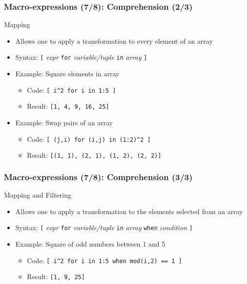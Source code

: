 \documentclass[aspectratio=169]{beamer}
\begin{document}
\begin{frame}[fragile=singleslide]
  \frametitle{Macro-expressions (7/8): Comprehension (2/3)}
  \begin{block}{Mapping}
    \begin{itemize}
    \item Allows one to apply a transformation to every element of an array
    \item Syntax: \texttt{[} \textit{expr} \texttt{for} \textit{variable/tuple}
      \texttt{in} \textit{array} \texttt{]}
    \item Example: Square elements in array
      \begin{itemize}
      \item Code: \texttt{[ i\^{}2 for i in 1:5 ]}
      \item Result: \texttt{[1, 4, 9, 16, 25]}
      \end{itemize}
    \item Example: Swap pairs of an array
      \begin{itemize}
      \item Code: \texttt{[ (j,i) for (i,j) in (1:2)\^{}2 ]}
      \item Result: \texttt{[(1, 1), (2, 1), (1, 2), (2, 2)]}
      \end{itemize}
    \end{itemize}
  \end{block}
\end{frame}

\begin{frame}[fragile=singleslide]
  \frametitle{Macro-expressions (7/8): Comprehension (3/3)}
  \begin{block}{Mapping and Filtering}
    \begin{itemize}
    \item Allows one to apply a transformation to the elements selected from an array
    \item Syntax: \texttt{[} \textit{expr} \texttt{for} \textit{variable/tuple}
      \texttt{in} \textit{array} \texttt{when} \textit{condition} \texttt{]}
    \item Example: Square of odd numbers between 1 and 5
      \begin{itemize}
      \item Code: \texttt{[ i\^{}2 for i in 1:5 when mod(i,2) == 1 ]}
      \item Result: \texttt{[1, 9, 25]}
      \end{itemize}
    \end{itemize}
  \end{block}
\end{frame}
\end{document}
